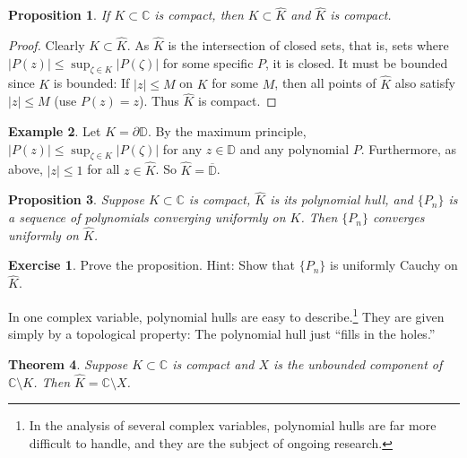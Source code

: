 \documentclass[12pt,openany]{book}
\newcommand{\sabs}[1]{\lvert {#1} \rvert}
\newcommand{\babs}[1]{\bigl\lvert {#1} \bigr\rvert}
\newcommand{\C}{{\mathbb{C}}}
\newcommand{\D}{{\mathbb{D}}}
\newcommand{\myquote}[1]{``#1''}
\theoremstyle{plain}
\newtheorem{thm}{Theorem}[section]
\newtheorem{prop}[thm]{Proposition}
\theoremstyle{remark}
\theoremstyle{definition}
\newenvironment{exbox}{%
    \def\FrameCommand{\vrule width 1pt \relax\hspace{10pt}}%
    \MakeFramed{\advance\hsize-\width\FrameRestore}%
}{%
    \endMakeFramed
}
\theoremstyle{exercise}
\newtheorem{exercise}{Exercise}[section]
\theoremstyle{example}
\newtheorem{example}[thm]{Example}
\begin{document}
\begin{prop}
If $K \subset \C$ is compact, then $K \subset \widehat{K}$ and $\widehat{K}$
is compact.
\end{prop}

\begin{proof}
Clearly $K \subset \widehat{K}$.  As $\widehat{K}$
is the intersection of closed sets, that is, sets where
$\babs{P(z)} \leq \sup_{\zeta \in K} \babs{P(\zeta)}$ for some specific $P$, it is closed.
It must be
bounded since $K$ is bounded:  If $\sabs{z} \leq M$ on $K$ for some $M$,
then all points of $\widehat{K}$ also satisfy $\sabs{z} \leq M$ (use $P(z)=z$).
Thus $\widehat{K}$ is compact.
\end{proof}

\begin{example}
Let $K = \partial \D$.  By the maximum principle,
$\babs{P(z)} \leq \sup_{\zeta \in K} \babs{P(\zeta)}$ for any $z \in \D$
and any polynomial $P$.
Furthermore, as above, $\sabs{z} \leq 1$ for all $z \in \widehat{K}$.
So $\widehat{K} = \overline{\D}$.
\end{example}

\begin{prop} \label{prop:convergenceonKhat}
Suppose $K \subset \C$ is compact, $\widehat{K}$ is its polynomial hull,
and $\{ P_n \}$ is a sequence of polynomials converging uniformly on
$K$.  Then $\{ P_n \}$ converges uniformly on $\widehat{K}$.  
\end{prop}

\begin{exbox}
\begin{exercise}
Prove the proposition.  Hint: Show that $\{ P_n \}$ is uniformly Cauchy on
$\widehat{K}$.
\end{exercise}
\end{exbox}

In one complex variable, polynomial hulls are easy to
describe.\footnote{In the analysis of several complex variables,
polynomial hulls are far more difficult to handle, and they are the subject
of ongoing research.}
They are given simply by a topological property: The polynomial
hull just \myquote{fills in the holes.}


\begin{thm}\label{thm:polyhull}
Suppose $K \subset \C$ is compact and $X$ is the unbounded component of
$\C \setminus K$.  Then $\widehat{K} = \C \setminus X$.
\end{thm}
\end{document}
